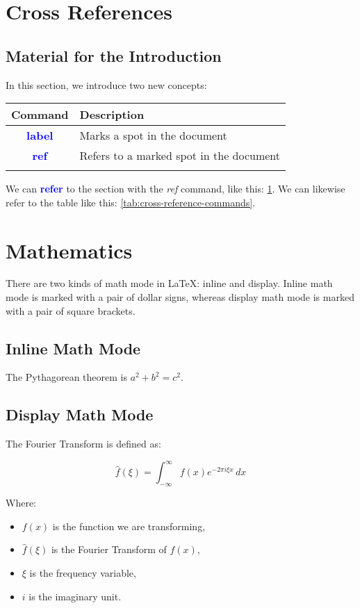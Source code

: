 \documentclass{article}
\newcommand{\kw}[1]{\textcolor{blue}{\textbf{#1}}}
\newcommand{\cmd}[1]{\textit{#1}}
\begin{document}
\section{Cross References}
\label{sec:cross-references}

\subsection{Material for the Introduction}

In this section, we introduce two new concepts:

\begin{tabular}{cp{9cm}}
  Command & Description \\
  \toprule
  \kw{label} & Marks a spot in the document \\
  \kw{ref} & Refers to a marked spot in the document \\
  \bottomrule
\label{tab:cross-reference-commands}
\end{tabular}

We can \kw{refer} to the section with the \cmd{ref} command, like this: \ref{sec:cross-references}.
We can likewise refer to the table like this: \ref{tab:cross-reference-commands}.

\section{Mathematics}

There are two kinds of math mode in LaTeX: inline and display. Inline math mode is marked with
a pair of dollar signs, whereas display math mode is marked with a pair of square brackets.

\subsection{Inline Math Mode}

The Pythagorean theorem is $a^2 + b^2 = c^2$.

\subsection{Display Math Mode}

The Fourier Transform is defined as:

\[
\hat{f}(\xi) = \int_{-\infty}^\infty f(x) e^{-2\pi i \xi x} \, dx
\]

Where:
\begin{itemize}
  \item \( f(x) \) is the function we are transforming,
  \item \( \hat{f}(\xi) \) is the Fourier Transform of \( f(x) \),
  \item \( \xi \) is the frequency variable,
  \item \( i \) is the imaginary unit.
\end{itemize}
\end{document}
